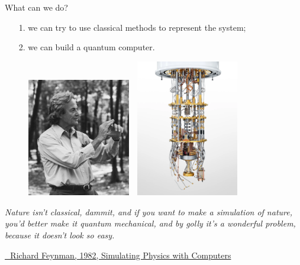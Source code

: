 \documentclass[8pt, xcolor={svgnames}, hyperref={linkcolor=amethyst}]{beamer}
\begin{document}
\begin{frame}{What can we do?}
\pause
\begin{itemize}[noitemsep]
\item[1.] we can try to use classical methods to represent the system;
\pause
\item[2.] we can build a quantum computer.
\end{itemize}
\pause
\begin{figure}
   \includegraphics[width=0.4\textwidth, height=0.55\textheight]{figures/feynmann.jpg}%
   $\,\,$ \pause
   \includegraphics[width=0.4\textwidth, height=0.55\textheight]{figures/qcomp.png}
\end{figure}

\small
\textit{Nature isn't classical, dammit, and if you want to make a simulation of nature, 
you'd better make it quantum mechanical, and by golly it's a wonderful problem, 
because it doesn't look so easy.} 

\href{https://link.springer.com/article/10.1007/BF02650179}{\faBook\,\, Richard Feynman, 1982, Simulating Physics with Computers}
\end{frame}
\end{document}
